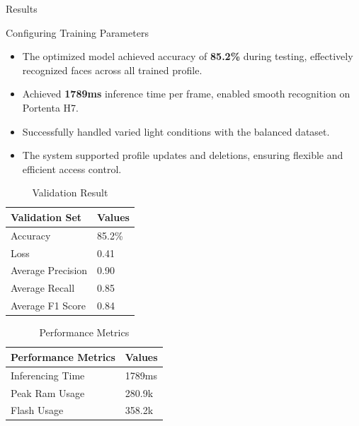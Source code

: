 \begin{frame}[allowframebreaks]{Results}
	\begin{block}{Configuring Training Parameters}
		\begin{itemize}
			
			\item The optimized model achieved accuracy of \textbf{85.2\%} during testing, effectively recognized  faces across all trained profile.
			
			\item Achieved \textbf{1789ms}  inference time per frame, enabled smooth recognition on Portenta H7. 
			
			\item Successfully handled varied light conditions with the balanced dataset.
			
			\item The system supported profile updates and deletions, ensuring flexible and efficient access control. 
			
			
		\end{itemize}
	\end{block}

\begin{table}[h!]
	\centering
	\small %
	\caption{Validation Result}
	\begin{tabular}{|p{3cm}|p{3cm}|} %
		\hline
		\textbf{Validation Set}             & \textbf{Values}                                  \\ \hline
		Accuracy                    &  85.2\%       \\ \hline
		Loss               & 0.41 \\ \hline
		Average Precision                     & 0.90 \\ \hline
		Average Recall                  & 0.85   \\ \hline
		Average F1 Score           & 0.84 \\ \hline

	\end{tabular}
	\label{tab: Validation_Result}
\end{table}

\begin{table}[h!]
	\centering
	\small %
	\caption{Performance Metrics}
	\begin{tabular}{|p{3cm}|p{3cm}|} %
		\hline
		\textbf{Performance Metrics}             & \textbf{Values}                                  \\ \hline
		Inferencing Time                    &  1789ms       \\ \hline
		Peak Ram Usage              & 280.9k \\ \hline
		Flash Usage                    & 358.2k \\ \hline
		

\end{tabular}
\end{table}
\end{frame}
